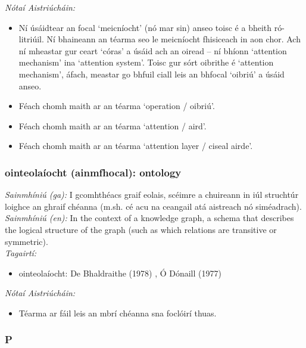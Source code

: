  \noindent \textit{Nótaí Aistriúcháin:}
\begin{itemize}
	\item Ní úsáidtear an focal `meicníocht' (nó mar sin) anseo toisc é a bheith ró-litriúil. Ní bhaineann an téarma seo le meicníocht fhisiceach in aon chor. Ach ní mheastar gur ceart `córas' a úsáid ach an oiread -- ní bhíonn `attention mechanism' ina `attention system'. Toisc gur sórt oibrithe é `attention mechanism', áfach, meastar go bhfuil ciall leis an bhfocal `oibriú' a úsáid anseo.
	\item Féach chomh maith ar an téarma `operation / oibriú'.
	\item Féach chomh maith ar an téarma `attention / aird'.
	\item Féach chomh maith ar an téarma `attention layer / ciseal airde'.
\end{itemize}


\subsubsection*{ointeolaíocht (ainmfhocal): ontology}
 \noindent \textit{Sainmhíniú (ga):} I gcomhthéacs graif eolais, scéimre a chuireann in iúl struchtúr loighce an ghraif chéanna (m.sh. cé acu na ceangail atá aistreach nó siméadrach).
\\
 \noindent \textit{Sainmhíniú (en):} In the context of a knowledge graph, a schema that describes the logical structure of the graph (such as which relations are transitive or symmetric).
\\
 \noindent \textit{Tagairtí:}
\begin{itemize}
	\item ointeolaíocht: De Bhaldraithe (1978) \cite{de-bhaldraithe}, Ó Dónaill (1977) \cite{odonaill}
\end{itemize}

 \noindent \textit{Nótaí Aistriúcháin:}
\begin{itemize}
	\item Téarma ar fáil leis an mbrí chéanna sna foclóirí thuas.
\end{itemize}


 \subsubsection*{P}

